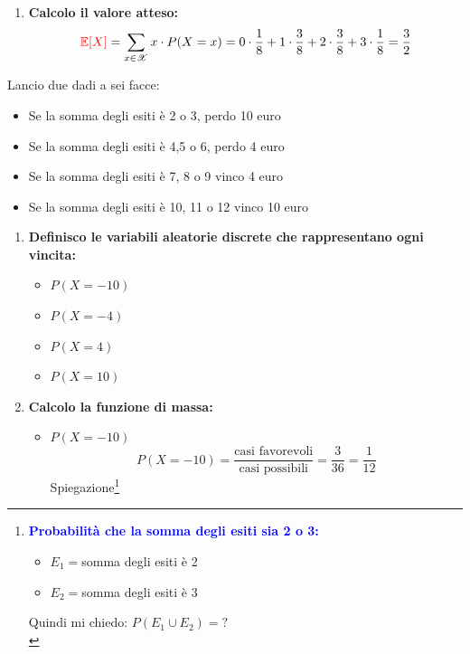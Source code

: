 \documentclass{article}  %
\theoremstyle{definition}
\begin{document}
\begin{esercizio}[Esercizio]
\begin{enumerate}
		\item \textbf{Calcolo il valore atteso:}
		      \[
			      \textcolor{red}{\mathbb{E}[X]}
			      =
			      \sum_{x \in \mathscr{X}} x \cdot P(X=x)
			      =
			      0 \cdot \frac{1}{8}
			      +
			      1 \cdot \frac{3}{8}
			      +
			      2 \cdot \frac{3}{8}
			      +
			      3 \cdot \frac{1}{8}= \frac{3}{2}
		      \]
	\end{enumerate}
\end{esercizio}

\begin{esercizio}[Esercizio]
	Lancio due dadi a sei facce:
	\begin{itemize}
		\item Se la somma degli esiti è 2 o 3, perdo 10 euro
		\item Se la somma degli esiti è 4,5 o 6, perdo 4 euro
		\item Se la somma degli esiti è 7, 8 o 9 vinco 4 euro
		\item Se la somma degli esiti è 10, 11 o 12 vinco 10 euro
	\end{itemize}
	\begin{enumerate}
		\item \textbf{Definisco le variabili aleatorie discrete che rappresentano ogni vincita:}
		      \begin{itemize}
			      \item $P(X=-10)$
			      \item $P(X=-4)$
			      \item $P(X=4)$
			      \item $P(X=10)$
		      \end{itemize}
		\item \textbf{Calcolo la funzione di massa:}
		      \begin{itemize}
			      \item $P(X=-10)$
			            \[
				            P(X=-10)=\frac{\text{casi favorevoli}}{\text{casi possibili}}=\frac{3}{36}=\frac{1}{12}
			            \]
			            Spiegazione\footnote{\tiny
				            \textcolor{blue}{\textbf{Probabilità che la somma degli esiti sia 2 o 3:}}
				            \begin{itemize}
					            \item $E_1=$somma degli esiti è 2
					            \item $E_2=$somma degli esiti è 3
				            \end{itemize}
				            Quindi mi chiedo: $P(E_1 \cup E_2)=?$ \\
}
\end{itemize}
\end{enumerate}
\end{esercizio}
\end{document}
